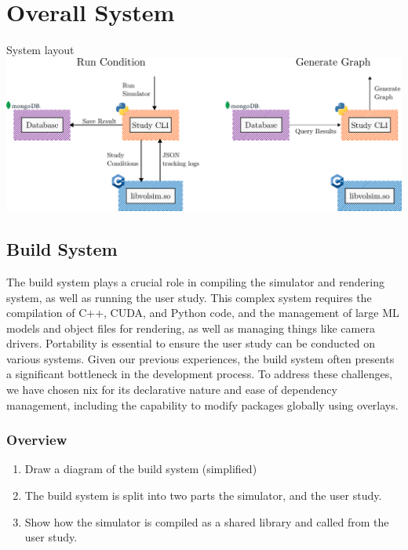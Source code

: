 \section{Overall System}

\todo

\begin{figureBox}[label={fig:System layout}, width=1.0\linewidth]{System layout}
    \includegraphics[width = 1.0\linewidth]{./implementation/figures/overall-system.pdf}
\end{figureBox}

\subsection{Build System}

The build system plays a crucial role in compiling the simulator and rendering system, as well as running the user study. This complex system requires the compilation of C++, CUDA, and Python code, and the management of large ML models and object files for rendering, as well as managing things like camera drivers. Portability is essential to ensure the user study can be conducted on various systems. Given our previous experiences, the build system often presents a significant bottleneck in the development process. To address these challenges, we have chosen nix for its declarative nature and ease of dependency management, including the capability to modify packages globally using overlays.

\subsubsection{Overview}
\begin{enumerate}
	\item Draw a diagram of the build system (simplified)
	\item The build system is split into two parts the simulator, and the user study.
	\item Show how the simulator is compiled as a shared library and called from the user study.
\end{enumerate}


